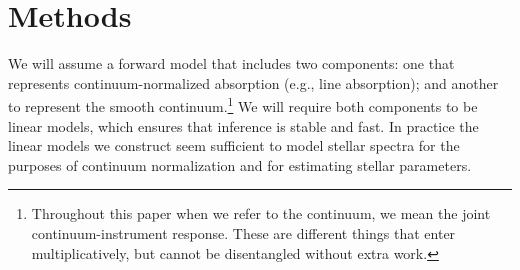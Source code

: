 \documentclass[modern]{aastex631}
\begin{document}
\section{Methods}\label{sec:methods}

We will assume a forward model that includes two components: one that represents continuum-normalized absorption (e.g., line absorption); and another to represent the smooth continuum.\footnote{Throughout this paper when we refer to the continuum, we mean the joint continuum-instrument response. These are different things that enter multiplicatively, but cannot be disentangled without extra work.} We will require both components to be linear models, which ensures that inference is stable and fast. In practice the linear models we construct seem sufficient to model stellar spectra for the purposes of continuum normalization and for estimating stellar parameters.\\



\end{document}
